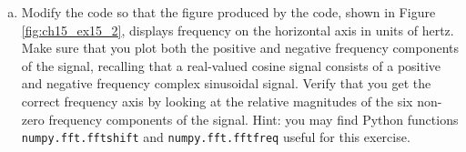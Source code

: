 \begin{enumerate}
\begin{enumerate}[a)]
          \item Modify the code so that the figure produced by the code, shown in Figure \ref{fig:ch15_ex15_2}, 
                displays frequency on the horizontal axis in units of hertz. Make sure that you plot both the 
                positive and negative frequency components of the signal, recalling that a real-valued cosine 
                signal consists of a positive and negative frequency complex sinusoidal signal. Verify that you 
                get the correct frequency axis by looking at the relative magnitudes of the six non-zero frequency 
                components of the signal. Hint: you may find Python 
                functions \verb|numpy.fft.fftshift| and \verb|numpy.fft.fftfreq| useful for this exercise.
        \end{enumerate}

\end{enumerate}
